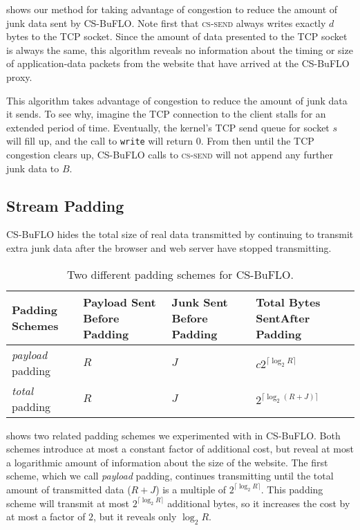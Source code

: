 \documentclass[10pt,journal]{IEEEtran}
\newcommand{\csb} {CS-BuFLO\xspace}
\begin{document}
 shows our method for taking advantage of congestion
to reduce the amount of junk data sent by \csb.  Note first that
\textsc{cs-send} always writes exactly $d$ bytes to the TCP socket.
Since the amount of data presented to the TCP socket is always the
same, this algorithm reveals no information about the timing or size
of application-data packets from the website that have arrived at the
\csb proxy.

This algorithm takes advantage of congestion to reduce the amount of
junk data it sends.  To see why, imagine the TCP connection to the
client stalls for an extended period of time.  Eventually, the
kernel's TCP send queue for socket $s$ will fill up, and the call to
\texttt{write} will return $0$.  From then until the TCP congestion
clears up, \csb calls to \textsc{cs-send} will not append any further
junk data to $B$.  

\subsection{Stream Padding}
\label{ssec:stream-padding}

\csb hides the total size of real data transmitted by continuing to
transmit extra junk data after the browser and web server have stopped
transmitting.

\begin{table}[t]
  \small
  \centering
  \bgroup
  \def\arraystretch{1.5}
  \begin{tabular}{|p{1.1cm}|p{2cm}|p{2cm}|p{2.2cm}|}\hline
    Padding Schemes      		&	Payload Sent \newline Before Padding	& Junk Sent	\newline Before Padding		&	Total Bytes Sent\newline After Padding \\
    \hline
    \hline
    \textit{payload} padding	&	$R$				&	$J$			&	$c2^{\lceil\log_2 R\rceil}$		\\
	\hline    
    \textit{total} padding		&	$R$				&	$J$			& 	$2^{\lceil\log_2 (R+J)\rceil}$		\\
    \hline
  \end{tabular}
  \egroup
  \caption{Two different padding schemes for \csb.}
  \label{tab:padding-schemes}
\end{table}


 shows two related padding schemes we experimented with in \csb.  Both
schemes introduce at most a constant factor of additional cost,
but reveal at most a logarithmic amount of information about the size
of the website.  The first scheme, which we call \textit{payload}
padding, continues transmitting until the total amount of transmitted
data ($R+J$) is a multiple of $2^{\lceil\log_2 R\rceil}$.  This
padding scheme will transmit at most $2^{\lceil\log_2 R\rceil}$
additional bytes, so it increases the cost by at most a factor of
$2$, but it reveals only $\log_2 R$.
\end{document}
